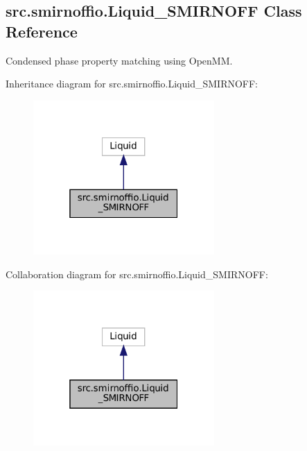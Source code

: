 \hypertarget{classsrc_1_1smirnoffio_1_1Liquid__SMIRNOFF}{}\subsection{src.\+smirnoffio.\+Liquid\+\_\+\+S\+M\+I\+R\+N\+O\+FF Class Reference}
\label{classsrc_1_1smirnoffio_1_1Liquid__SMIRNOFF}


Condensed phase property matching using Open\+MM.  




Inheritance diagram for src.\+smirnoffio.\+Liquid\+\_\+\+S\+M\+I\+R\+N\+O\+FF\+:
\nopagebreak
\begin{figure}[H]
\begin{center}
\leavevmode
\includegraphics[width=196pt]{classsrc_1_1smirnoffio_1_1Liquid__SMIRNOFF__inherit__graph}
\end{center}
\end{figure}


Collaboration diagram for src.\+smirnoffio.\+Liquid\+\_\+\+S\+M\+I\+R\+N\+O\+FF\+:
\nopagebreak
\begin{figure}[H]
\begin{center}
\leavevmode
\includegraphics[width=196pt]{classsrc_1_1smirnoffio_1_1Liquid__SMIRNOFF__coll__graph}
\end{center}
\end{figure}
